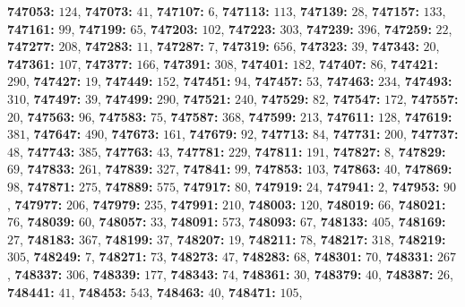 \textsf{\bfseries 747053:} $124$, \textsf{\bfseries 747073:} $41$, \textsf{\bfseries 747107:} $6$, \textsf{\bfseries 747113:} $113$, \textsf{\bfseries 747139:} $28$, \textsf{\bfseries 747157:} $133$, \textsf{\bfseries 747161:} $99$, \textsf{\bfseries 747199:} $65$, \textsf{\bfseries 747203:} $102$, \textsf{\bfseries 747223:} $303$, \textsf{\bfseries 747239:} $396$, \textsf{\bfseries 747259:} $22$, \textsf{\bfseries 747277:} $208$, \textsf{\bfseries 747283:} $11$, \textsf{\bfseries 747287:} $7$, \textsf{\bfseries 747319:} $656$, \textsf{\bfseries 747323:} $39$, \textsf{\bfseries 747343:} $20$, \textsf{\bfseries 747361:} $107$, \textsf{\bfseries 747377:} $166$, \textsf{\bfseries 747391:} $308$, \textsf{\bfseries 747401:} $182$, \textsf{\bfseries 747407:} $86$, \textsf{\bfseries 747421:} $290$, \textsf{\bfseries 747427:} $19$, \textsf{\bfseries 747449:} $152$, \textsf{\bfseries 747451:} $94$, \textsf{\bfseries 747457:} $53$, \textsf{\bfseries 747463:} $234$, \textsf{\bfseries 747493:} $310$, \textsf{\bfseries 747497:} $39$, \textsf{\bfseries 747499:} $290$, \textsf{\bfseries 747521:} $240$, \textsf{\bfseries 747529:} $82$, \textsf{\bfseries 747547:} $172$, \textsf{\bfseries 747557:} $20$, \textsf{\bfseries 747563:} $96$, \textsf{\bfseries 747583:} $75$, \textsf{\bfseries 747587:} $368$, \textsf{\bfseries 747599:} $213$, \textsf{\bfseries 747611:} $128$, \textsf{\bfseries 747619:} $381$, \textsf{\bfseries 747647:} $490$, \textsf{\bfseries 747673:} $161$, \textsf{\bfseries 747679:} $92$, \textsf{\bfseries 747713:} $84$, \textsf{\bfseries 747731:} $200$, \textsf{\bfseries 747737:} $48$, \textsf{\bfseries 747743:} $385$, \textsf{\bfseries 747763:} $43$, \textsf{\bfseries 747781:} $229$, \textsf{\bfseries 747811:} $191$, \textsf{\bfseries 747827:} $8$, \textsf{\bfseries 747829:} $69$, \textsf{\bfseries 747833:} $261$, \textsf{\bfseries 747839:} $327$, \textsf{\bfseries 747841:} $99$, \textsf{\bfseries 747853:} $103$, \textsf{\bfseries 747863:} $40$, \textsf{\bfseries 747869:} $98$, \textsf{\bfseries 747871:} $275$, \textsf{\bfseries 747889:} $575$, \textsf{\bfseries 747917:} $80$, \textsf{\bfseries 747919:} $24$, \textsf{\bfseries 747941:} $2$, \textsf{\bfseries 747953:} $90$, \textsf{\bfseries 747977:} $206$, \textsf{\bfseries 747979:} $235$, \textsf{\bfseries 747991:} $210$, \textsf{\bfseries 748003:} $120$, \textsf{\bfseries 748019:} $66$, \textsf{\bfseries 748021:} $76$, \textsf{\bfseries 748039:} $60$, \textsf{\bfseries 748057:} $33$, \textsf{\bfseries 748091:} $573$, \textsf{\bfseries 748093:} $67$, \textsf{\bfseries 748133:} $405$, \textsf{\bfseries 748169:} $27$, \textsf{\bfseries 748183:} $367$, \textsf{\bfseries 748199:} $37$, \textsf{\bfseries 748207:} $19$, \textsf{\bfseries 748211:} $78$, \textsf{\bfseries 748217:} $318$, \textsf{\bfseries 748219:} $305$, \textsf{\bfseries 748249:} $7$, \textsf{\bfseries 748271:} $73$, \textsf{\bfseries 748273:} $47$, \textsf{\bfseries 748283:} $68$, \textsf{\bfseries 748301:} $70$, \textsf{\bfseries 748331:} $267$, \textsf{\bfseries 748337:} $306$, \textsf{\bfseries 748339:} $177$, \textsf{\bfseries 748343:} $74$, \textsf{\bfseries 748361:} $30$, \textsf{\bfseries 748379:} $40$, \textsf{\bfseries 748387:} $26$, \textsf{\bfseries 748441:} $41$, \textsf{\bfseries 748453:} $543$, \textsf{\bfseries 748463:} $40$, \textsf{\bfseries 748471:} $105$, 
